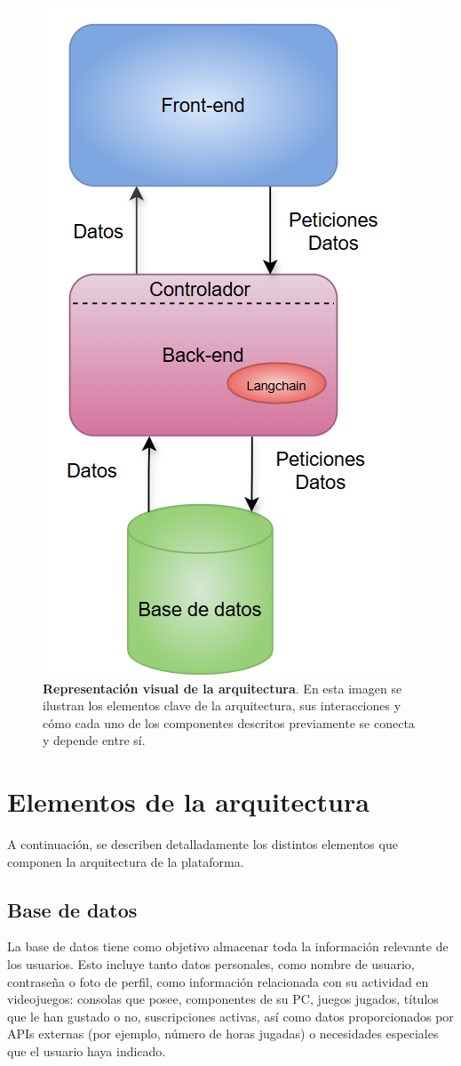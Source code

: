 \begin{figure}[H]
    \centering
    \includegraphics[width=0.5\linewidth]{imagenes/arquitectura.png}
    \caption[\textbf{Representación visual de la arquitectura}]{\textbf{Representación visual de la arquitectura}. En esta imagen se ilustran los elementos clave de la arquitectura, sus interacciones y cómo cada uno de los componentes descritos previamente se conecta y depende entre sí.}
    \label{arquitectura}
\end{figure}



\newpage

\section{Elementos de la arquitectura}

A continuación, se describen detalladamente los distintos elementos que componen la arquitectura de la plataforma.

\subsection{Base de datos}

La base de datos tiene como objetivo almacenar toda la información relevante de los usuarios. Esto incluye tanto datos personales, como nombre de usuario, contraseña o foto de perfil, como información relacionada con su actividad en videojuegos: consolas que posee, componentes de su PC, juegos jugados, títulos que le han gustado o no, suscripciones activas, así como datos proporcionados por APIs externas (por ejemplo, número de horas jugadas) o necesidades especiales que el usuario haya indicado.

